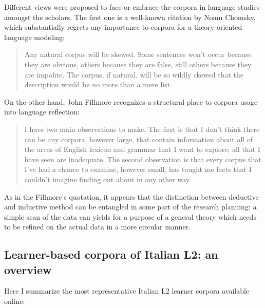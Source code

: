 \documentclass[a4paper,twoside,12pt,chapterprefix=false,bibliography=totocnumbered,listof=flat]{scrbook}
\theoremstyle{definition}
\theoremstyle{definition}
\theoremstyle{definition}
\theoremstyle{remark}
\begin{document}
Different views were proposed to face or embrace the corpora in language
studies amongst the scholars. The first one is a well-known citation by
Noam Chomsky, which substantially regrets any importance to corpora for
a theory-oriented language modeling:

\begin{quote}
Any natural corpus will be skewed. Some sentences won't occur because
they are obvious, others because they are false, still others because
they are impolite. The corpus, if natural, will be so wildly skewed that
the description would be no more than a mere list.

\citep[Chomsky 1962, \emph{A transformational approach to syntax}
in][]{togninibonelli2001}
\end{quote}

On the other hand, John Fillmore recognizes a structural place to
corpora usage into language reflection:

\begin{quote}
I have two main observations to make. The first is that I don't think
there can be any corpora, however large, that contain information about
all of the areas of English lexicon and grammar that I want to explore;
all that I have seen are inadequate. The second observation is that
every corpus that I've had a chance to examine, however small, has
taught me facts that I couldn't imagine finding out about in any other
way.

\citep{fillmore1992}
\end{quote}

As in the Fillmore's quotation, it appears that the distinction between
deductive and inductive method can be entangled in some part of the
research planning: a simple scan of the data can yields for a purpose of
a general theory which needs to be refined on the actual data in a more
circular manner.

\subsection{Learner-based corpora of Italian L2: an
overview}\label{learner-based-corpora-of-italian-l2-an-overview}

Here I summarize the most representative Italian L2 learner corpora
available online:
\end{document}
